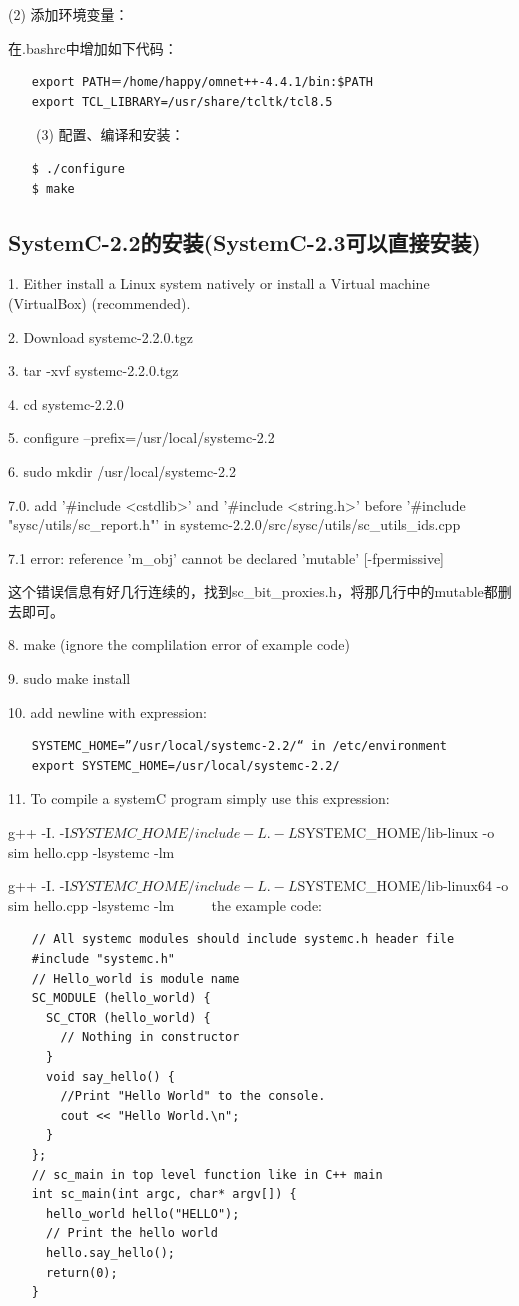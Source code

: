(2) 添加环境变量：

在.bashrc中增加如下代码：
\begin{verbatim}
　　export PATH＝/home/happy/omnet++-4.4.1/bin:$PATH
　　export TCL_LIBRARY=/usr/share/tcltk/tcl8.5
\end{verbatim}

　　(3) 配置、编译和安装：
\begin{verbatim}
　　$ ./configure
　　$ make
\end{verbatim}

\subsection{SystemC-2.2的安装(SystemC-2.3可以直接安装)}
1. Either install a Linux system natively or install a Virtual machine (VirtualBox) (recommended).

2. Download systemc-2.2.0.tgz 

3. tar -xvf systemc-2.2.0.tgz

4. cd systemc-2.2.0

5. configure --prefix=/usr/local/systemc-2.2

6. sudo mkdir /usr/local/systemc-2.2

7.0. add '\#include <cstdlib>' and '\#include <string.h>' before '\#include "sysc/utils/sc\_report.h"' in systemc-2.2.0/src/sysc/utils/sc\_utils\_ids.cpp

7.1 error: reference 'm\_obj' cannot be declared 'mutable' [-fpermissive]

这个错误信息有好几行连续的，找到sc\_bit\_proxies.h，将那几行中的mutable都删去即可。

8. make (ignore the complilation error of example code)

9. sudo make install

10. add newline with expression:
\begin{verbatim}
　　SYSTEMC_HOME=”/usr/local/systemc-2.2/“ in /etc/environment
　　export SYSTEMC_HOME=/usr/local/systemc-2.2/
\end{verbatim}

11. To compile a systemC program simply use this expression: 

g++ -I. -I$SYSTEMC\_HOME/include -L. -L$SYSTEMC\_HOME/lib-linux -o sim hello.cpp -lsystemc -lm %

g++ -I. -I$SYSTEMC\_HOME/include -L. -L$SYSTEMC\_HOME/lib-linux64 -o sim hello.cpp -lsystemc -lm %
　　
the example code:
\begin{verbatim}
　　// All systemc modules should include systemc.h header file
　　#include "systemc.h"
　　// Hello_world is module name
　　SC_MODULE (hello_world) {
　　  SC_CTOR (hello_world) {
　　    // Nothing in constructor 
　　  }
　　  void say_hello() {
　　    //Print "Hello World" to the console.
　　    cout << "Hello World.\n";
　　  }
　　};
　　// sc_main in top level function like in C++ main
　　int sc_main(int argc, char* argv[]) {
　　  hello_world hello("HELLO");
　　  // Print the hello world
　　  hello.say_hello();
　　  return(0);
　　}
\end{verbatim}

